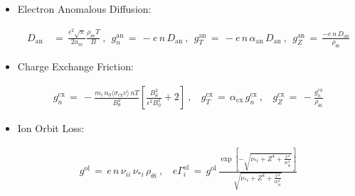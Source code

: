\documentclass[a4paper,8pt]{article}
\providecommand{\tightlist}{%
  \setlength{\itemsep}{0pt}\setlength{\parskip}{0pt}}
\begin{document}
\begin{itemize}
\tightlist
\item
  Electron Anomalous Diffusion: \small

  \begin{align}
  D_\text{an} \,&=\, \frac{\epsilon^2 \sqrt{\pi}}{2 a_m}
      \frac{\rho_{\theta e} T}{B}~,~~
      g_n^\text{an} \,=\, -e \,n\, D_\text{an}~,~~
      g_T^\text{an} \,=\, -e \,n\, \alpha_\text{an}\, D_\text{an}~,~~
      g_Z^\text{an} \,=\, \frac{-e \,n\, D_\text{an}}{\rho_{\theta i}}
  \end{align}

  \normalsize
\item
  Charge Exchange Friction: \small

  \begin{align}
  g_n^\text{cx} \,=\,
      -\frac{m_i \,n_0 \langle\sigma_\text{cx} v\rangle \,n T}{B_\theta^2}
      \left[\frac{B_\theta^2}{\epsilon^2 B_\phi^2} + 2\right]~,~~~~
      g_T^\text{cx} \,=\, \alpha_\text{cx}\,g_n^\text{cx}~,~~~~
      g_Z^\text{cx} \,=\, -\frac{g_n^\text{cx}}{\rho_{\theta i}}
  \end{align}

  \normalsize
\item
  Ion Orbit Loss: \small

  \begin{align}
  g^\text{ol} \,=\, e \,n\, \nu_{ii} \, \nu_{*i} \, \rho_{\theta i}~,~~~~
  e\Gamma_i^\text{ol} \,=\, g^\text{ol} \, \frac{
      \exp\left[-\sqrt{\nu_{*i} + Z^4 + \frac{x^4}{w_{bi}^4}}\right]}
      {\sqrt{\nu_{*i} + Z^4 + \frac{x^4}{w_{bi}^4}}}
  \end{align}

  \normalsize
\end{itemize}
\end{document}
